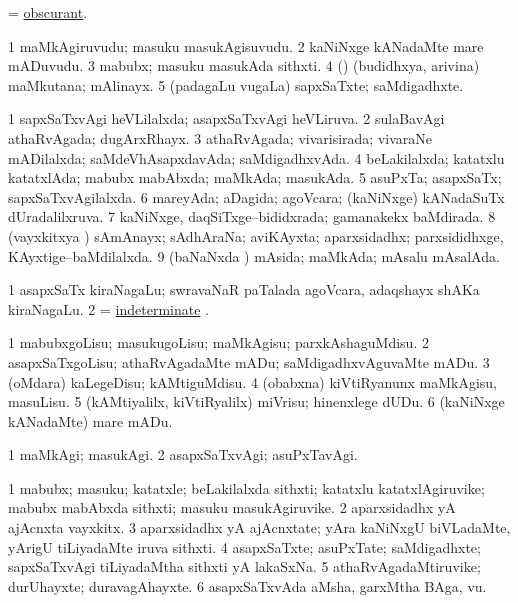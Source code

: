 \bentry
{}
\gl{\nA}
\bmng
= \hyperlink{obscurant}{obscurant}. 
\emng
\eentry

\bentry
{}
\gl{\nA}
\bmng
\bnum
\num{1} maMkAgiruvudu; masuku masukAgisuvudu. 
\num{2} kaNiNxge kANadaMte mare mADuvudu. 
\num{3} mabubx; masuku masukAda sithxti. 
\num{4} (\rUpa) (budidhxya, arivina) maMkutana; mAlinayx. 
\num{5} (padagaLu \mo vugaLa) sapxSaTxte; saMdigadhxte. 
\enum
\emng
\eentry

\bentry
{}
\gl{\gu}
\bmng
% 
\bnum
\num{1} sapxSaTxvAgi heVLilalxda; asapxSaTxvAgi heVLiruva. 
\num{2} sulaBavAgi athaRvAgada; dugArxRhayx. 
\num{3} athaRvAgada; vivarisirada; vivaraNe mADilalxda; saMdeVhAsapxdavAda; saMdigadhxvAda. 
\num{4} beLakilalxda; katatxlu katatxlAda; mabubx mabAbxda; maMkAda; masukAda. 
\num{5} asuPxTa; asapxSaTx; sapxSaTxvAgilalxda. 
\num{6} mareyAda; aDagida; agoVcara; (kaNiNxge) kANadaSuTx dUradalilxruva. 
\num{7} kaNiNxge, daqSiTxge--bididxrada; gamanakekx baMdirada. 
\num{8} (vayxkitxya \vi) sAmAnayx; sAdhAraNa; aviKAyxta; aparxsidadhx; parxsididhxge, KAyxtige--baMdilalxda. 
\num{9} (baNaNxda \vi) mAsida; maMkAda; mAsalu mAsalAda. 
\enum
\emng

\noindent
\gl{\pagu}
\bmng
\bnum
\num{1}  asapxSaTx kiraNagaLu; swravaNaR paTalada agoVcara, adaqshayx shAKa kiraNagaLu. 
\num{2}  = \hyperref{kandict_i.pdf}{I}{indeterminate pagu}{indeterminate} . 
\enum
\emng
\eentry

\bentry
{}
\gl{\sakirx}
\bmng
\bnum
\num{1} mabubxgoLisu; masukugoLisu; maMkAgisu; parxkAshaguMdisu. 
\num{2} asapxSaTxgoLisu; athaRvAgadaMte mADu; saMdigadhxvAguvaMte mADu. 
\num{3} (oMdara) kaLegeDisu; kAMtiguMdisu. 
\num{4} (obabxna) kiVtiRyanunx maMkAgisu, masuLisu. 
\num{5} (kAMtiyalilx, kiVtiRyalilx) miVrisu; hinenxlege dUDu. 
\num{6} (kaNiNxge kANadaMte) mare mADu. 
\enum
\emng
\eentry

\bentry
{}
\gl{\kirxvi}
\bmng
\bnum
\num{1} maMkAgi; masukAgi. 
\num{2} asapxSaTxvAgi; asuPxTavAgi. 
\enum
\emng
\eentry

\bentry
{}
\gl{\nA}
\bmng
% 
\bnum
\num{1} mabubx; masuku; katatxle; beLakilalxda sithxti; katatxlu katatxlAgiruvike; mabubx mabAbxda sithxti; masuku masukAgiruvike. 
\num{2} aparxsidadhx yA ajAcnxta vayxkitx. 
\num{3} aparxsidadhx yA ajAcnxtate; yAra kaNiNxgU biVLadaMte, yArigU tiLiyadaMte iruva sithxti. 
\num{4} asapxSaTxte; asuPxTate; saMdigadhxte; sapxSaTxvAgi tiLiyadaMtha sithxti yA lakaSxNa. 
\num{5} athaRvAgadaMtiruvike; durUhayxte; duravagAhayxte. 
\num{6} asapxSaTxvAda aMsha, garxMtha BAga, \mo vu. 
\enum
\emng
\eentry

